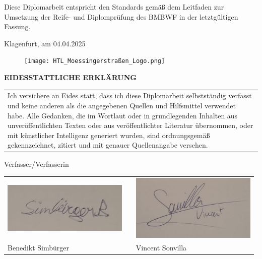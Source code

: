 \documentclass[12pt, twoside]{article}
\begin{document}
\vspace{7mm}
\large
Diese Diplomarbeit entspricht den Standards gemäß dem Leitfaden zur Umsetzung der Reife- und Diplomprüfung des BMBWF in der letztgültigen Fassung.\par
\begin{flushright}
    Klagenfurt, am 04.04.2025
\end{flushright}

\newpage

\begin{figure}[h]
    \texttt{[image: HTL\_Moessingerstraßen\_Logo.png]}
    \centering
\end{figure}

\begin{center}
    \huge \textbf{EIDESSTATTLICHE ERKLÄRUNG}\\
    \vspace{7mm}
    \large
    \begin{tabular}{p{14cm}}
        Ich versichere an Eides statt, dass ich diese Diplomarbeit
        selbstständig verfasst und keine anderen als die angegebenen
        Quellen und Hilfsmittel verwendet habe. Alle Gedanken, die im
        Wortlaut oder in grundlegenden Inhalten aus unveröffentlichten
        Texten oder aus veröffentlichter Literatur übernommen, oder mit
        künstlicher Intelligenz generiert wurden, sind ordnungsgemäß
        gekennzeichnet, zitiert und mit genauer Quellenangabe
        versehen.
    \end{tabular}

    \vspace{10mm}
    Verfasser/Verfasserin\\
    \vspace{10mm}
    \begin{tabular}{P{67mm}cP{67mm}}
        \includegraphics[width=60mm]{sign_simbuerger.jpg} & & \includegraphics[width=60mm]{sign_sonvilla.jpg} \\
        Benedikt Simbürger & & Vincent Sonvilla\\
    \end{tabular}
    


\end{center}
\end{document}
